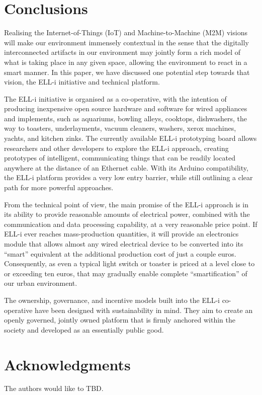 \documentclass[final]{siamltex}
\begin{document}

\section{Conclusions}
\label{sec:conclusions}

Realising the Internet-of-Things (IoT) and Machine-to-Machine (M2M)
visions will make our environment immensely contextual in the sense
that the digitally interconnected artifacts in our environment may
jointly form a rich model of what is taking place in any given space,
allowing the environment to react in a smart manner.  In this paper,
we have discussed one potential step towards that vision, the ELL-i
initiative and technical platform.

The ELL-i initiative is organised as a co-operative, with the
intention of producing inexpensive open source hardware and software
for wired appliances and implements, such as aquariums, bowling
alleys, cooktops, dishwashers, the way to toasters, underlayments,
vacuum cleaners, washers, xerox machines, yachts, and kitchen zinks.
The currently available ELL-i prototyping board allows researchers and
other developers to explore the ELL-i approach, creating prototypes of
intelligent, communicating things that can be readily located anywhere
at the distance of an Ethernet cable.  With its Arduino compatibility,
the ELL-i platform provides a very low entry barrier, while still
outlining a clear path for more powerful approaches.

From the technical point of view, the main promise of the ELL-i
approach is in its ability to provide reasonable amounts of electrical
power, combined with the communication and data processing capability,
at a very reasonable price point.  If ELL-i ever reaches
mass-production quantities, it will provide an electronics module that
allows almost any wired electrical device to be converted into its
``smart'' equivalent at the additional production cost of just a
couple euros.  Consequently, as even a typical light switch or toaster
is priced at a level close to or exceeding ten euros, that may
gradually enable complete ``smartification'' of our urban
environment. 

The ownership, governance, and incentive models built into the ELL-i
co-operative have been designed with sustainability in mind.  They aim
to create an openly governed, jointly owned platform that is firmly
anchored within the society and developed as an essentially public good.

\section*{Acknowledgments}

The authors would like to TBD.

{}

\end{document}
